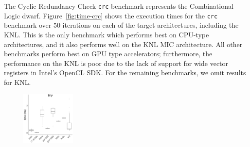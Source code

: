 \documentclass[../document.tex]{subfiles}
\begin{document}
\label{ssec:time}
	
The Cyclic Redundancy Check {\tt crc} benchmark represents the Combinational Logic dwarf.
Figure~\ref{fig:time-crc} shows the execution times for the {\tt crc} benchmark over 50 iterations on each of the target architectures, including the KNL.
This is the only benchmark which performs best on CPU-type architectures, and it also performs well on the KNL MIC architecture.
All other benchmarks perform best on GPU type accelerators; furthermore, the performance on the KNL is poor due to the lack of support for wide vector registers in Intel's OpenCL SDK.
For the remaining benchmarks, we omit results for KNL.

\newcommand{\plotwidth}{0.24\textwidth}
\begin{figure}[t]
	\centering
	\includegraphics[width=\plotwidth]{figures/time-results/generate_crc_tiny_boxplot_knl-1}

\end{figure}
\end{document}
